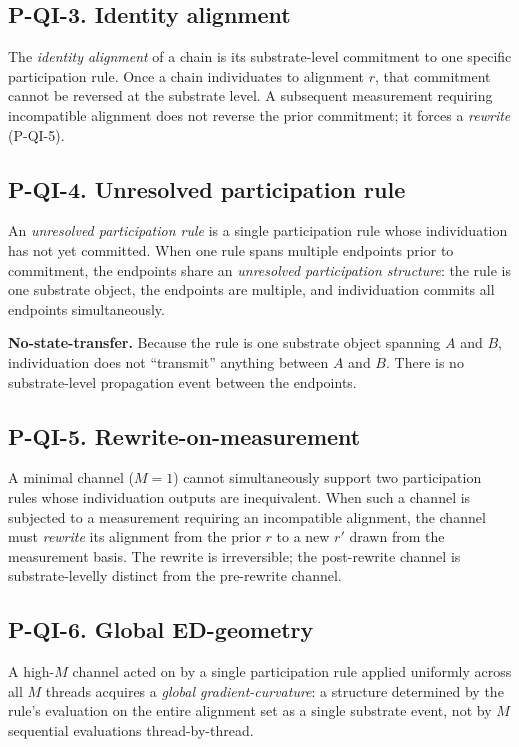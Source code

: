 \documentclass[11pt,a4paper]{article}
\begin{document}
\subsection{P-QI-3. Identity alignment}

The \emph{identity alignment} of a chain is its substrate-level commitment to one specific participation rule. Once a chain individuates to alignment $r$, that commitment cannot be reversed at the substrate level. A subsequent measurement requiring incompatible alignment does not reverse the prior commitment; it forces a \emph{rewrite} (P-QI-5).

\subsection{P-QI-4. Unresolved participation rule}

An \emph{unresolved participation rule} is a single participation rule whose individuation has not yet committed. When one rule spans multiple endpoints prior to commitment, the endpoints share an \emph{unresolved participation structure}: the rule is one substrate object, the endpoints are multiple, and individuation commits all endpoints simultaneously.

\textbf{No-state-transfer.} Because the rule is one substrate object spanning $A$ and $B$, individuation does not ``transmit'' anything between $A$ and $B$. There is no substrate-level propagation event between the endpoints.

\subsection{P-QI-5. Rewrite-on-measurement}

A minimal channel ($M = 1$) cannot simultaneously support two participation rules whose individuation outputs are inequivalent. When such a channel is subjected to a measurement requiring an incompatible alignment, the channel must \emph{rewrite} its alignment from the prior $r$ to a new $r'$ drawn from the measurement basis. The rewrite is irreversible; the post-rewrite channel is substrate-levelly distinct from the pre-rewrite channel.

\subsection{P-QI-6. Global ED-geometry}

A high-$M$ channel acted on by a single participation rule applied uniformly across all $M$ threads acquires a \emph{global gradient-curvature}: a structure determined by the rule's evaluation on the entire alignment set as a single substrate event, not by $M$ sequential evaluations thread-by-thread.
\end{document}
